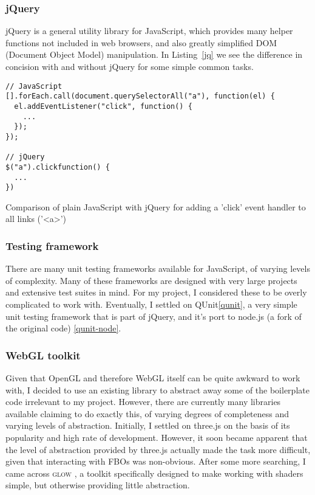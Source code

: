 \documentclass[12pt,twoside,notitlepage]{report}
\begin{document}
\subsubsection{jQuery}
jQuery is a general utility library for JavaScript, which provides many helper functions not included in web browsers, and also greatly simplified DOM (Document Object Model) manipulation. In Listing~\ref{jq} we see the difference in concision with and without jQuery for some simple common tasks.

\begin{listing}[H]
\label{jq}
\begin{verbatim}
// JavaScript
[].forEach.call(document.querySelectorAll("a"), function(el) {
  el.addEventListener("click", function() {
    ...
  });
});

// jQuery
$("a").clickfunction() {
  ...
})

\end{verbatim}
\caption{Comparison of plain JavaScript with jQuery for adding a 'click' event handler to all links ('<a>')}
\end{listing}

\subsubsection{Testing framework}
There are many unit testing frameworks available for JavaScript, of varying levels of complexity. Many of these frameworks are designed with very large projects and extensive test suites in mind. For my project, I considered these to be overly complicated to work with. Eventually, I settled on QUnit\ref{qunit}, a very simple unit testing framework that is part of jQuery, and it's port to node.js (a fork of the original code) \ref{qunit-node}.

\subsubsection{WebGL toolkit}
Given that OpenGL and therefore WebGL itself can be quite awkward to work with, I decided to use an existing library to abstract away some of the boilerplate code irrelevant to my project. However, there are currently many libraries available claiming to do exactly this, of varying degrees of completeness and varying levels of abstraction. Initially, I settled on three.js \cite{three} on the basis of its popularity and high rate of development. However, it soon became apparent that the level of abstraction provided by three.js actually made the task more difficult, given that interacting with FBOs was non-obvious. After some more searching, I came across \textsc{glow} \cite{glow}, a toolkit specifically designed to make working with shaders simple, but otherwise providing little abstraction.
\end{document}
